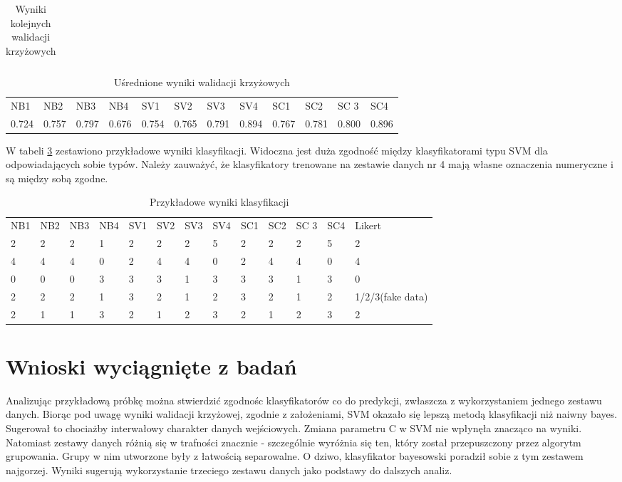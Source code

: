 \documentclass[12pt,a4paper,oneside]{report} %
\begin{document}
\begin{table}
\begin{tabular}{l|l|l|l|l|l|l|l|l|l|l}
\hline
\end{tabular}
\caption{Wyniki kolejnych walidacji krzyżowych}
\label{crossvaltab}
\end{table}

\begin{table}
\begin{tabular}{l|l|l|l|l|l|l|l|l|l|l|l}
\hline
NB1 & NB2 & NB3 & NB4 & SV1 & SV2 & SV3 & SV4 & SC1 & SC2 & SC 3 & SC4 \\
    0.724 & 0.757 & 0.797 & 0.676 & 0.754 & 0.765 & 0.791 & 0.894 & 0.767 & 0.781 & 0.800 & 0.896 \\
\hline
\end{tabular}
\caption{Uśrednione wyniki walidacji krzyżowych}
\label{crossvaltabav}
\end{table}

W tabeli \ref{sampleout} zestawiono przykładowe wyniki klasyfikacji. Widoczna jest duża zgodność między klasyfikatorami typu SVM dla odpowiadających sobie typów. Należy zauważyć, że klasyfikatory trenowane na zestawie danych nr 4 mają własne oznaczenia numeryczne i są między sobą zgodne.

\begin{table}
\begin{tabular}{l|l|l|l|l|l|l|l|l|l|l|l|l}
\hline
NB1 & NB2 & NB3 & NB4 & SV1 & SV2 & SV3 & SV4 & SC1 & SC2 & SC 3 & SC4 & Likert \\
2 & 2 & 2 & 1 & 2 & 2 & 2 & 5 & 2 & 2 & 2 & 5 & 2 \\ 
4 & 4 & 4 & 0 & 2 & 4 & 4 & 0 & 2 & 4 & 4 & 0 & 4 \\ 
0 & 0 & 0 & 3 & 3 & 3 & 1 & 3 & 3 & 3 & 1 & 3 & 0 \\ 
2 & 2 & 2 & 1 & 3 & 2 & 1 & 2 & 3 & 2 & 1 & 2 & 1/2/3(fake data) \\ 
2 & 1 & 1 & 3 & 2 & 1 & 2 & 3 & 2 & 1 & 2 & 3 & 2 \\ 
\hline
\end{tabular}
\caption{Przykładowe wyniki klasyfikacji}
\label{sampleout}
\end{table}

\section{Wnioski wyciągnięte z badań}

Analizując przykładową próbkę można stwierdzić zgodnośc klasyfikatorów co do predykcji, zwłaszcza z wykorzystaniem jednego zestawu danych. Biorąc pod uwagę wyniki walidacji krzyżowej, zgodnie z założeniami, SVM okazało się lepszą metodą klasyfikacji niż naiwny bayes. Sugerował to chociażby interwałowy charakter danych wejściowych. Zmiana parametru C w SVM nie wpłynęła znacząco na wyniki. Natomiast zestawy danych różnią się w trafności znacznie - szczególnie wyróżnia się ten, który został przepuszczony przez algorytm grupowania. Grupy w nim utworzone były z łatwością separowalne. O dziwo, klasyfikator bayesowski poradził sobie z tym zestawem najgorzej. Wyniki sugerują wykorzystanie trzeciego zestawu danych jako podstawy do dalszych analiz. \par
\end{document}
